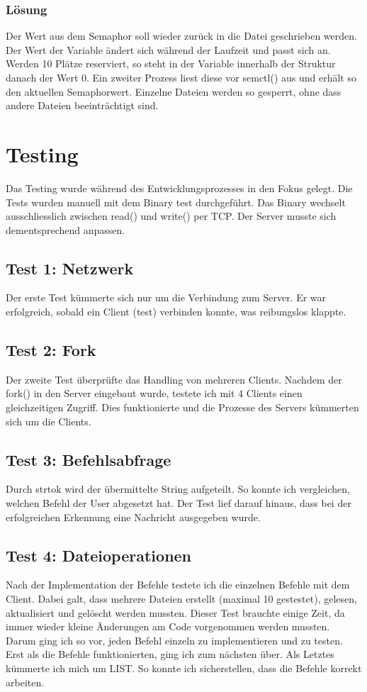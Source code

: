 \documentclass[12pt,a4paper,ngerman]{report}
\begin{document}
\subsubsection{Lösung}
Der Wert aus dem Semaphor soll wieder zurück in die Datei geschrieben werden. Der Wert der Variable ändert sich während der Laufzeit und passt sich an. Werden 10 Plätze reserviert, so steht in der Variable innerhalb der Struktur danach der Wert 0. Ein zweiter Prozess liest diese vor semctl() aus und erhält so den aktuellen Semaphorwert. Einzelne Dateien werden so gesperrt, ohne dass andere Dateien beeinträchtigt sind.
\section{Testing}
Das Testing wurde während des Entwicklungsprozesses in den Fokus gelegt. Die Tests wurden manuell mit dem Binary test durchgeführt. Das Binary wechselt ausschliesslich zwischen read() und write() per TCP. Der Server musste sich dementsprechend anpassen.
\subsection{Test 1: Netzwerk}
Der erste Test kümmerte sich nur um die Verbindung zum Server. Er war erfolgreich, sobald ein Client (test) verbinden konnte, was reibungslos klappte.
\subsection{Test 2: Fork}
Der zweite Test überprüfte das Handling von mehreren Clients. Nachdem der fork() in den Server eingebaut wurde, testete ich mit 4 Clients einen gleichzeitigen Zugriff. Dies funktionierte und die Prozesse des Servers kümmerten sich um die Clients.
\subsection{Test 3: Befehlsabfrage}
Durch strtok wird der übermittelte String aufgeteilt. So konnte ich vergleichen, welchen Befehl der User abgesetzt hat. Der Test lief darauf hinaus, dass bei der erfolgreichen Erkennung eine Nachricht ausgegeben wurde.
\subsection{Test 4: Dateioperationen}
Nach der Implementation der Befehle testete ich die einzelnen Befehle mit dem Client. Dabei galt, dass mehrere Dateien erstellt (maximal 10 gestestet), gelesen, aktualisiert und gelöscht werden mussten. Dieser Test brauchte einige Zeit, da immer wieder kleine Änderungen am Code vorgenommen werden mussten. Darum ging ich so vor, jeden Befehl einzeln zu implementieren und zu testen. Erst als die Befehle funktionierten, ging ich zum nächsten über. Als Letztes kümmerte ich mich um LIST. So konnte ich sicherstellen, dass die Befehle korrekt arbeiten.
\end{document}
